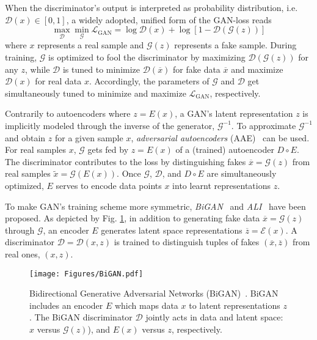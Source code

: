 \documentclass[lettersize,journal]{IEEEtran}
\begin{document}
When the discriminator's output is interpreted as probability distribution, i.e.\ $\mathcal{D}(x)\in[0,1]$, a widely adopted, unified form of the GAN-loss reads
\begin{equation}
\max _{\mathcal{D}} \min _{\mathcal{G}} \mathcal{L}_\text{GAN} = \log \mathcal{D}(x) +\log[1-\mathcal{D}(\mathcal{G}(z))]
\end{equation}
where $x$ represents a real sample and $\mathcal{G}(z)$ represents a fake sample. During training, $\mathcal{G}$ is optimized to fool the discriminator by maximizing $\mathcal{D}(\mathcal{G}(z))$ for any $z$, while $\mathcal{D}$ is tuned to minimize $\mathcal{D}(\overline{x})$ for fake data $\overline{x}$ and maximize $\mathcal{D}(x)$ for real data $x$. Accordingly, the parameters of $\mathcal{G}$ and $\mathcal{D}$ get simultaneously tuned to minimize and maximize $\mathcal{L}_\text{GAN}$, respectively.

Contrarily to autoencoders where $z=E(x)$, a GAN’s latent representation $z$ is implicitly modeled through the inverse of the generator, $\mathcal{G}^{-1}$. To approximate $\mathcal{G}^{-1}$ and obtain $z$ for a given sample $x$, \textit{adversarial autoencoders} (AAE)~\cite{makhzani2015adversarial} can be used. For real samples $x$, $\mathcal{G}$ gets fed by $z=E(x)$ of a (trained) autoencoder $D\circ E$. The discriminator contributes to the loss by distinguishing fakes $\overline{x}=\mathcal{G}(z)$ from real samples $\tilde{x}=\mathcal{G}(E(x))$. Once $\mathcal{G}$, $\mathcal{D}$, and $D\circ E$ are simultaneously optimized, $E$ serves to encode data points $x$ into learnt representations $z$.

To make GAN's training scheme more symmetric, \textit{BiGAN}~\cite{donahue2016adversarial,donahue2019large} and \textit{ALI}~\cite{dumoulin2016adversarially} have been proposed. As depicted by Fig. \ref{fig:BiGAN}, in addition to generating fake data $\overline{x}=\mathcal{G}(z)$ through $\mathcal{G}$, an encoder $E$ generates latent space representations $\overline{z}=\mathcal{E}(x)$. A discriminator $\mathcal{D}=\mathcal{D}(x,z)$ is trained to distinguish tuples of fakes $(\overline{x},\overline{z})$ from real ones, $(x,z)$.

\begin{figure}
\centering
\texttt{[image: Figures/BiGAN.pdf]}
\caption[BiGAN]{Bidirectional Generative Adversarial Networks (BiGAN)~\cite{donahue2016adversarial}. BiGAN includes an encoder $E$ which maps data $x$ to latent representations $z$. The BiGAN discriminator $\mathcal{D}$ jointly acts in data and latent space: $x$ versus $\mathcal{G}(z)$), and $E(x)$ versus $z$, respectively.}
\label{fig:BiGAN}
\end{figure}
\end{document}
